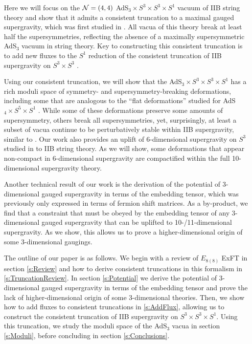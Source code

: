 \documentclass[a4paper, 11pt]{article}
\numberwithin{equation}{section}
\newcommand{\EE}{\ensuremath{E_{8(8)}}\xspace}
\newcommand{\+}{\oplus}
\begin{document}
Here we will focus on the ${\cal N}=(4,4)$ AdS$_3 \times S^3 \times S^3 \times S^1$ vacuum of IIB string theory and show that it admits a consistent truncation to a maximal gauged supergravity, which was first studied in \cite{Hohm:2005ui}. All vacua of this theory break at least half the supersymmetries, reflecting the absence of a maximally supersymmetric AdS$_3$ vacuum in string theory. Key to constructing this consistent truncation is to add new fluxes to the $S^1$ reduction of the consistent truncation of IIB supergravity on $S^3 \times S^3$ \cite{Inverso:2016eet}.

Using our consistent truncation, we will show that the AdS$_3 \times S^3 \times S^3 \times S^1$ has a rich moduli space of symmetry- and supersymmetry-breaking deformations, including some that are analogous to the ``flat deformations'' studied for AdS$_4 \times S^5 \times S^1$ \cite{Guarino:2020gfe,Guarino:2021hrc,Giambrone:2021zvp,Giambrone:2021wsm}. While some of these deformations preserve some amounts of supersymmetry, others break all supersymmetries, yet, surprisingly, at least a subset of vacua continue to be perturbatively stable within IIB supergravity, similar to \cite{Giambrone:2021wsm}. Our work also provides an uplift of 6-dimensional supergravity on $S^3$ studied in \cite{Eloy:2021fhc} to IIB string theory. As we will show, some deformations that appear non-compact in 6-dimensional supergravity \cite{Eloy:2021fhc} are compactified within the full 10-dimensional supergravity theory.

Another technical result of our work is the derivation of the potential of 3-dimensional gauged supergravity \cite{Nicolai:2000sc,Nicolai:2001sv} in terms of the embedding tensor, which was previously only expressed in terms of fermion shift matrices. As a by-product, we find that a constraint that must be obeyed by the embedding tensor of any 3-dimensional gauged supergravity that can be uplifted to 10-/11-dimensional supergravity. As we show, this allows us to prove a higher-dimensional origin of some 3-dimensional gaugings.

The outline of our paper is as follows. We begin with a review of $\EE$ ExFT in section \ref{s:Review} and how to derive consistent truncations in this formalism in \ref{s:TruncationReview}. In section \ref{s:Potential} we derive the potential of 3-dimensional gauged supergravity in terms of the embedding tensor and prove the lack of higher-dimensional origin of some 3-dimensional theories. Then, we show how to add fluxes to consistent truncations in \ref{s:AddFlux}, allowing us to construct the consistent truncation of IIB supergravity on $S^3 \times S^3 \times S^1$. Using this truncation, we study the moduli space of the AdS$_3$ vacua in section \ref{s:Moduli}, before concluding in section \ref{s:Conclusions}.
\end{document}
